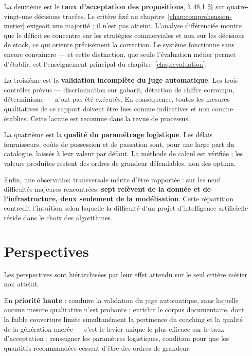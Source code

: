 La deuxième est le \textbf{taux d'acceptation des propositions}, à 48,1 \% sur quatre-vingt-une décisions tracées. Le critère fixé au chapitre~\ref{chap:comprehension-metier} exigeait une majorité ; il n'est pas atteint. L'analyse différenciée montre que le déficit se concentre sur les stratégies commerciales et non sur les décisions de stock, ce qui oriente précisément la correction. Le système fonctionne sans encore convaincre — et cette distinction, que seule l'évaluation métier permet d'établir, est l'enseignement principal du chapitre~\ref{chap:evaluation}.

La troisième est la \textbf{validation incomplète du juge automatique}. Les trois contrôles prévus — discrimination sur gabarit, détection de chiffre corrompu, déterminisme — n'ont pas été exécutés. En conséquence, toutes les mesures qualitatives de ce rapport doivent être lues comme indicatives et non comme établies. Cette lacune est reconnue dans la revue de processus.

La quatrième est la \textbf{qualité du paramétrage logistique}. Les délais fournisseurs, coûts de possession et de passation sont, pour une large part du catalogue, laissés à leur valeur par défaut. La méthode de calcul est vérifiée ; les valeurs produites restent des ordres de grandeur défendables, non des optima.

Enfin, une observation transversale mérite d'être rapportée : sur les neuf difficultés majeures rencontrées, \textbf{sept relèvent de la donnée et de l'infrastructure, deux seulement de la modélisation}. Cette répartition contredit l'intuition selon laquelle la difficulté d'un projet d'intelligence artificielle réside dans le choix des algorithmes.

\section*{Perspectives}

Les perspectives sont hiérarchisées par leur effet attendu sur le seul critère métier non atteint.

En \textbf{priorité haute} : conduire la validation du juge automatique, sans laquelle aucune mesure qualitative n'est probante ; enrichir le corpus documentaire, dont la faible couverture limite simultanément la pertinence du coaching et la qualité de la génération ancrée — c'est le levier unique le plus efficace sur le taux d'acceptation ; renseigner les paramètres logistiques, condition pour que les quantités recommandées cessent d'être des ordres de grandeur.

